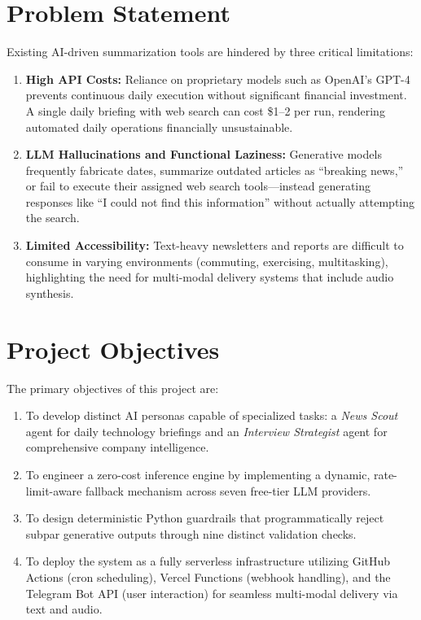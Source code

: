 \documentclass[12pt,a4paper]{report}
\begin{document}
\section{Problem Statement}
Existing AI-driven summarization tools are hindered by three critical limitations:
\begin{enumerate}
    \item \textbf{High API Costs:} Reliance on proprietary models such as OpenAI's GPT-4 prevents continuous daily execution without significant financial investment. A single daily briefing with web search can cost \$1--2 per run, rendering automated daily operations financially unsustainable.
    \item \textbf{LLM Hallucinations and Functional Laziness:} Generative models frequently fabricate dates, summarize outdated articles as ``breaking news,'' or fail to execute their assigned web search tools---instead generating responses like ``I could not find this information'' without actually attempting the search.
    \item \textbf{Limited Accessibility:} Text-heavy newsletters and reports are difficult to consume in varying environments (commuting, exercising, multitasking), highlighting the need for multi-modal delivery systems that include audio synthesis.
\end{enumerate}

\section{Project Objectives}
The primary objectives of this project are:
\begin{enumerate}
    \item To develop distinct AI personas capable of specialized tasks: a \textit{News Scout} agent for daily technology briefings and an \textit{Interview Strategist} agent for comprehensive company intelligence.
    \item To engineer a zero-cost inference engine by implementing a dynamic, rate-limit-aware fallback mechanism across seven free-tier LLM providers.
    \item To design deterministic Python guardrails that programmatically reject subpar generative outputs through nine distinct validation checks.
    \item To deploy the system as a fully serverless infrastructure utilizing GitHub Actions (cron scheduling), Vercel Functions (webhook handling), and the Telegram Bot API (user interaction) for seamless multi-modal delivery via text and audio.
\end{enumerate}
\end{document}
